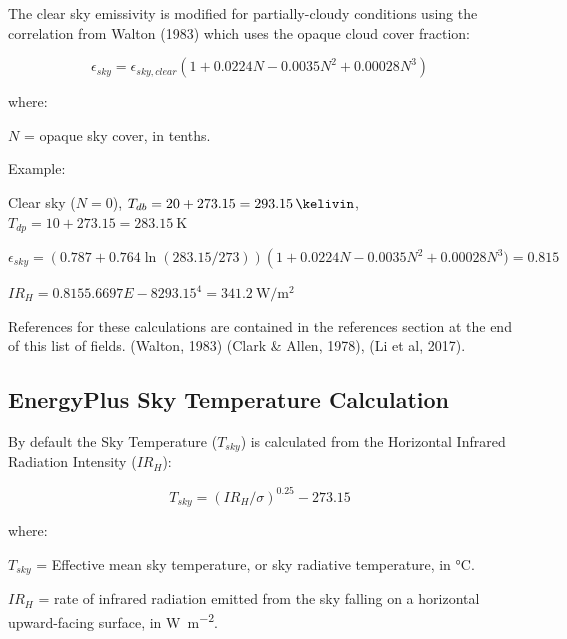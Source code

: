 The clear sky emissivity is modified for partially-cloudy conditions using the correlation from Walton (1983) which uses the opaque cloud cover fraction:

\begin{equation}
\epsilon_{sky} = \epsilon_{sky, clear} \left(1 + 0.0224  N - 0.0035  N^2 + 0.00028  N^3\right)
\end{equation}

\noindent where:
\newline

$N$ = opaque sky cover, in tenths.
\newline

\noindent Example:
\newline

Clear sky ($N=0$), $T_{db} = 20 + 273.15 = \SI{293.15}{\kelivin}$, $T_{dp} = 10 + 273.15 = \SI{283.15}{\kelvin}$
\newline

$\epsilon_{sky} = \left(0.787 + 0.764  \ln\left(283.15/273\right)\right)  \left(1 + 0.0224  N - 0.0035  N^2 + 0.00028  N^3) = 0.815$
\newline

$IR_H = 0.815  5.6697E-8  293.15^4 = \SI{341.2}{\watt\per\meter\squared}$
\newline

References for these calculations are contained in the references section at the end of this list of fields. (Walton, 1983) (Clark \& Allen, 1978), (Li et al, 2017).

\subsection{EnergyPlus Sky Temperature Calculation}\label{energyplus-sky-temperature-calculation}

By default the Sky Temperature ($T_{sky}$) is calculated from the Horizontal Infrared Radiation Intensity ($IR_H$):

\begin{equation}
T_{sky} = \left(IR_H / \sigma\right)^{0.25} - 273.15
\end{equation}

\noindent where:
\newline

$T_{sky}$ = Effective mean sky temperature, or sky radiative temperature, in \si{\celsius}.
\newline

$IR_H$ = rate of infrared radiation emitted from the sky falling on a horizontal upward-facing surface, in \si{\watt\per\meter\squared}.
\newline

